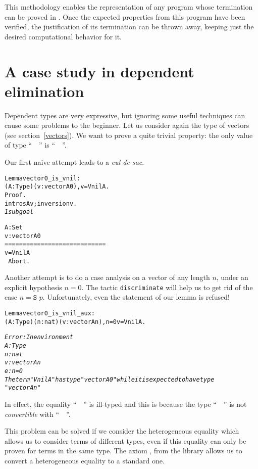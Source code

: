 \documentclass[11pt]{article}
\begin{document}
This methodology enables the representation
of any program whose termination can be proved in {\coq}. Once the
expected properties from this program have been verified, the
justification of its termination can be thrown away, keeping just the
desired computational behavior for it.

\section{A case study in dependent elimination}\label{CaseStudy}

Dependent types are very expressive, but ignoring some useful
techniques can cause some problems to the beginner.
Let us consider again the type of vectors (see section~\ref{vectors}).
We want to prove a quite trivial property: the only value of type
``~~'' is ``~~''.

Our first naive attempt leads to a \emph{cul-de-sac}.
\begin{alltt}
Lemma vector0_is_vnil :
  {\prodsym} (A:Type)(v:vector A 0), v = Vnil A.
Proof.
 intros A v;inversion v.
\it
1 subgoal

  A : Set
  v : vector A 0
  ============================
   v = Vnil A
\tt
Abort.
\end{alltt}

Another attempt is to do a case analysis on a vector of any length
$n$, under an explicit hypothesis $n=0$. The tactic
\texttt{discriminate} will help us to get rid of the case
$n=\texttt{S $p$}$.
Unfortunately, even the statement of our lemma is refused!

\begin{alltt}
 Lemma vector0_is_vnil_aux :
 {\prodsym} (A:Type)(n:nat)(v:vector A n), n = 0 {\arrow} v = Vnil A.

\it
Error: In environment
A : Type
n : nat
v : vector A n
e : n = 0
The term "Vnil A" has type "vector A 0" while it is expected to have type
 "vector A n"
\end{alltt}

In effect, the equality ``~~'' is ill-typed and this is
because the type ``~~'' is not \emph{convertible}
with ``~~''.

This problem can be solved if we consider the heterogeneous
equality  \cite{conor:motive}
which allows us to consider terms of different types, even if this
equality can only be proven for terms in the same type.
The axiom , from the library  allows us to convert a
heterogeneous equality to a standard one.
\end{document}
